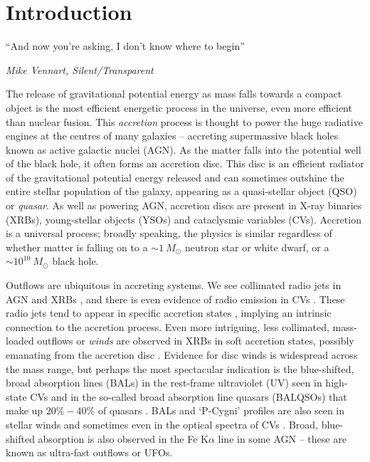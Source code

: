 \chapter{Introduction}

\epigraph{``And now you're asking, I don't know where to begin''}{{\sl Mike Vennart, Silent/Transparent}}
%

The release of gravitational potential energy as mass falls towards
a compact object is the most efficient energetic process in the universe,
even more efficient than nuclear fusion.
This {\em accretion} process is thought to power the huge radiative engines at the 
centres of many galaxies -- accreting supermassive black holes 
known as active galactic nuclei (AGN).
As the matter falls into the potential well of the 
black hole, it often forms an accretion disc.
This disc is an efficient radiator of the gravitational potential energy released
and can sometimes outshine the entire stellar population of the galaxy,
appearing as a quasi-stellar object (QSO) or {\em quasar}. 
As well as powering AGN, accretion discs are present in X-ray binaries (XRBs), 
young-stellar objects (YSOs) and
cataclysmic variables (CVs). Accretion is a universal process; 
broadly speaking, the physics is similar regardless of 
whether matter is falling on to a $\sim1~M_\odot$ neutron star or white dwarf,
or a $\sim10^{10}~M_\odot$ black hole. 

Outflows are ubiquitous in accreting systems. We see collimated radio jets in AGN 
\citep{hazard1963,potash1980,perley1984,marscher2006} and XRBs \citep{bellonijet2010}, 
and there is even evidence of radio emission in 
CVs \citep{benz1983,kordingDNjet2008,coppejans2015}. 
These radio jets tend to appear in specific 
accretion states \citep{fender2001,fender2004,kordingDNjet2008}, 
implying an intrinsic connection to the 
accretion process. Even more intriguing, less collimated, mass-loaded outflows
or {\em winds} are observed in XRBs in soft accretion states, 
possibly emanating from the accretion disc \citep{ponti2012}.
Evidence for disc winds is widespread across the mass range, 
but perhaps the most spectacular indication
is the blue-shifted, broad absorption lines (BALs) in the rest-frame ultraviolet (UV)
seen in high-state CVs \citep{heap1978,greensteinoke1982,cordova1982}
and in the so-called broad absorption line quasars (BALQSOs) that make up $20\%-40\%$
of quasars \citep{weymann1991,knigge2008,allen2011}. 
BALs and `P-Cygni' profiles \citep{struve1935,rottenburg1952}
are also seen in stellar winds \citep[e.g.][]{cassinelli1979} and sometimes even
in the optical spectra of CVs \citep{patterson1996, RN98, kafka2004}. 
Broad, blue-shifted absorption is also observed in the Fe K$\alpha$ line in 
some AGN \citep{reeves2003,poundsreeves2009,tombesi2010a} -- these are known
as ultra-fast outflows or UFOs.

